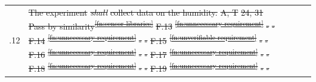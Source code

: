 \documentclass[a4paper,12pt,twoside]{article}
\providecommand{\DIFaddtex}[1]{{\protect\color{blue}\uwave{#1}}} %
\providecommand{\DIFdeltex}[1]{{\protect\color{red}\sout{#1}}}                      %
\providecommand{\DIFaddend}{} %
\providecommand{\DIFdelbegin}{} %
\providecommand{\DIFadd}[1]{\texorpdfstring{\DIFaddtex{#1}}{#1}} %
\providecommand{\DIFdel}[1]{\texorpdfstring{\DIFdeltex{#1}}{}} %
\newcommand{\DIFscaledelfig}{0.5}
\newlength{\DIFdelgraphicswidth} %
\newlength{\DIFdelgraphicsheight} %
\newcommand{\DIFdelincludegraphics}[2][]{%
\sbox{\DIFdelgraphicsbox}{\DIFOincludegraphics[#1]{#2}}%
\settoboxwidth{\DIFdelgraphicswidth}{\DIFdelgraphicsbox} %
\settoboxtotalheight{\DIFdelgraphicsheight}{\DIFdelgraphicsbox} %
\scalebox{\DIFscaledelfig}{%
\parbox[b]{\DIFdelgraphicswidth}{\usebox{\DIFdelgraphicsbox}\\[-\baselineskip] \rule{\DIFdelgraphicswidth}{0em}}\llap{\resizebox{\DIFdelgraphicswidth}{\DIFdelgraphicsheight}{%
\setlength{\unitlength}{\DIFdelgraphicswidth}%
\begin{picture}(1,1)%
\thicklines\linethickness{2pt} %
{\color[rgb]{1,0,0}\put(0,0){\framebox(1,1){}}}%
{\color[rgb]{1,0,0}\put(0,0){\line( 1,1){1}}}%
{\color[rgb]{1,0,0}\put(0,1){\line(1,-1){1}}}%
\end{picture}%
}\hspace*{3pt}}} %
} %
\DeclareRobustCommand{\DIFaddend}{\DIFOaddend \let\includegraphics\DIFOincludegraphics} %
\DeclareRobustCommand{\DIFdelbegin}{\DIFOdelbegin \let\includegraphics\DIFdelincludegraphics} %
\begin{document}
\begin{longtable}[]{|m{}| m{} |m{} |m{}|m{}|}
\DIFadd{P}\DIFaddend .12 & \DIFdelbegin \DIFdel{The experiment }\textit{\DIFdel{shall}} %
\DIFdel{collect data on the humidity. }%
\DIFdel{A, T }%
\DIFdel{24, 31  }%
\DIFdel{Pass by similarity\textsuperscript{\ref{fn:sensor-libraries}}}%
\DIFdel{F.13 }%
\DIFdel{\textsuperscript{\ref{fn:unnecessary-requirement}}}%
\DIFdel{- }%
\DIFdel{-}%
\DIFdel{F.14 }%
\DIFdel{\textsuperscript{\ref{fn:unnecessary-requirement}} }%
\DIFdel{-}%
\DIFdel{- }%
\DIFdel{F.15 }%
\DIFdel{\textsuperscript{\ref{fn:unverifiable-requirement}}}%
\DIFdel{- }%
\DIFdel{-}%
\DIFdel{F.16 }%
\DIFdel{\textsuperscript{\ref{fn:unnecessary-requirement}} }%
\DIFdel{- }%
\DIFdel{- }%
\DIFdel{F.17 }%
\DIFdel{\textsuperscript{\ref{fn:unnecessary-requirement}} }%
\DIFdel{- }%
\DIFdel{- }%
\DIFdel{F.18 }%
\DIFdel{\textsuperscript{\ref{fn:unnecessary-requirement}} }%
\DIFdel{- }%
\DIFdel{- }%
\DIFdel{F.19 }%
\DIFdel{\textsuperscript{\ref{fn:unnecessary-requirement}} }%
\DIFdel{- }%
\DIFdel{- }%

\end{longtable}
\end{document}
